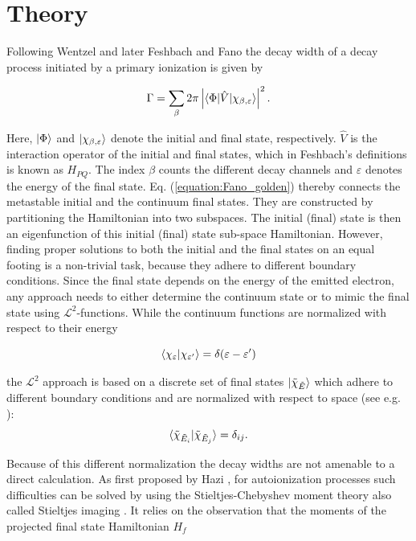 \section{Theory}
\label{section:theory}

Following Wentzel \cite{Wentzel27} and later Feshbach \cite{Feshbach58,Feshbach62}
and Fano \cite{Fano61}
the decay width of a decay process initiated by a
primary ionization is given by 

\begin{equation} \label{equation:Fano_golden}
  \Gamma = \sum_\beta 2\pi
           \left| \braket{\Phi|\hat{V}|\chi_{\beta,\varepsilon}} \right|^2 .
\end{equation}

Here, $\ket{\Phi}$ and $\ket{\chi_{\beta,\varepsilon}}$ denote the initial and
final state, respectively. $\hat{V}$ is the interaction operator of the
initial and final states, which in Feshbach's definitions is known as $H_{PQ}$.
The index $\beta$ counts the different
decay channels and $\varepsilon$ denotes the energy of the final state.
Eq. (\ref{equation:Fano_golden}) thereby connects the metastable initial
and the continuum final states. They are constructed by partitioning the
Hamiltonian into two subspaces. The initial (final) state is then an
eigenfunction of this initial (final) state sub-space Hamiltonian.
However, finding proper solutions to both the initial and the final
states on an equal footing is a non-trivial task, because they adhere to
different boundary conditions. Since the final state depends on the energy
of the emitted electron, any approach needs to either determine the continuum
state or to mimic the final state using $\mathcal{L}^2$-functions.
While the continuum functions are normalized with respect to their energy

\begin{equation}
 \braket{\chi_\varepsilon| \chi_{\varepsilon'}} = \delta(\varepsilon-\varepsilon')
\end{equation}

the $\mathcal{L}^2$ approach is based on a discrete set of final states
$\ket{\tilde{\chi}_{\tilde{E}}}$
which adhere to different boundary
conditions and are normalized with respect to space (see e.g. \cite{Craigie14}):
\begin{equation}
 \braket{ \tilde{\chi}_{\tilde{E}_i} | \tilde{\chi}_{\tilde{E}_j} } = \delta_{ij}.
\end{equation}

Because of this different normalization the decay widths are not amenable to
a direct calculation. As first proposed by Hazi \cite{hazi1978}, for
autoionization processes such difficulties
can be solved by using the
Stieltjes-Chebyshev moment theory also called Stieltjes imaging
\cite{Langhoff76,Corcoran77,MuellerPlathe90}.
It relies on the observation that the moments of the projected final
state Hamiltonian $H_f$

